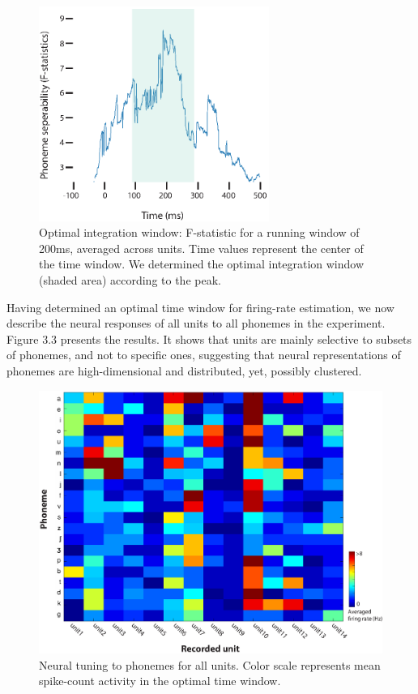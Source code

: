 \begin{figure}[H]
\vspace{.3in}
\includegraphics[width=\linewidth, height=7cm]{Figures/Ch3/Figure1_new.eps}
\caption{Optimal integration window: F-statistic for a running window of 200ms, averaged across units. Time values represent the center of the time window. We determined the optimal integration window (shaded area) according to the peak.}
\end{figure}

Having determined an optimal time window for firing-rate estimation, we now describe the neural responses of all units to all phonemes in the experiment. Figure 3.3 presents the results. It shows that units are mainly selective to subsets of phonemes, and not to specific ones, suggesting that neural representations of phonemes are high-dimensional and distributed, yet, possibly clustered.

\begin{figure}[H]
\vspace{.3in}
\includegraphics[width=\linewidth]{Figures/Ch3/Figure3_new.eps}
\caption{Neural tuning to phonemes for all units. Color scale represents mean spike-count activity in the optimal time window.}
\end{figure}

